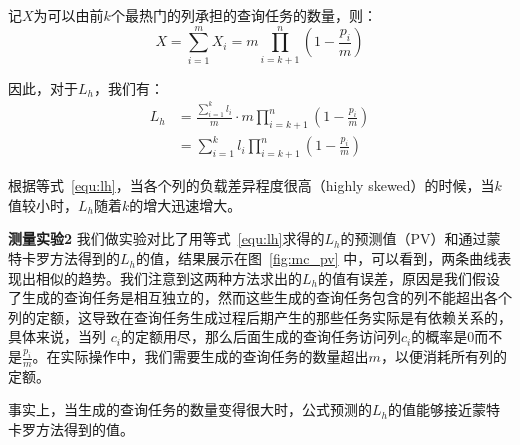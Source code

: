 记$X$为可以由前$k$个最热门的列承担的查询任务的数量，则：
\begin{equation}
X = \sum_{i=1}^m X_i = m \prod_{i=k+1}^{n}\left(1-\frac{p_{i}}{m}\right)
\end{equation}

因此，对于$L_h$，我们有：
\begin{equation}
\label{equ:lh}
\begin{split}
L_h &= \frac{\sum_{i=1}^{k} l_{i}}{m}  \cdot m \prod_{i=k+1}^{n}\left(1-\frac{p_{i}}{m}\right) \\
&= \sum_{i=1}^{k} l_{i} \prod_{i=k+1}^{n}\left(1-\frac{p_{i}}{m}\right)
\end{split}
\end{equation}

根据等式~\ref{equ:lh}，当各个列的负载差异程度很高（highly skewed）的时候，当$k$值较小时，$L_h$随着$k$的增大迅速增大。

\par \noindent \textbf{测量实验2} \quad 我们做实验对比了用等式~\ref{equ:lh}求得的$L_h$的预测值（PV）和通过蒙特卡罗方法得到的$L_h$的值，结果展示在图~\ref{fig:mc_pv} 中，可以看到，两条曲线表现出相似的趋势。我们注意到这两种方法求出的$L_h$的值有误差，原因是我们假设了生成的查询任务是相互独立的，然而这些生成的查询任务包含的列不能超出各个列的定额，这导致在查询任务生成过程后期产生的那些任务实际是有依赖关系的，具体来说，当列 $c_i$的定额用尽，那么后面生成的查询任务访问列$c_i$的概率是$0$而不是$\frac{p_i}{m}$。在实际操作中，我们需要生成的查询任务的数量超出$m$，以便消耗所有列的定额。

\par 事实上，当生成的查询任务的数量变得很大时，公式预测的$L_h$的值能够接近蒙特卡罗方法得到的值。


